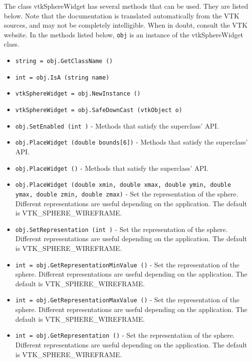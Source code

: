 The class vtkSphereWidget has several methods that can be used.
  They are listed below.
Note that the documentation is translated automatically from the VTK sources,
and may not be completely intelligible.  When in doubt, consult the VTK website.
In the methods listed below, \verb|obj| is an instance of the vtkSphereWidget class.
\begin{itemize}
\item  \verb|string = obj.GetClassName ()|

\item  \verb|int = obj.IsA (string name)|

\item  \verb|vtkSphereWidget = obj.NewInstance ()|

\item  \verb|vtkSphereWidget = obj.SafeDownCast (vtkObject o)|

\item  \verb|obj.SetEnabled (int )| -  Methods that satisfy the superclass' API.

\item  \verb|obj.PlaceWidget (double bounds[6])| -  Methods that satisfy the superclass' API.

\item  \verb|obj.PlaceWidget ()| -  Methods that satisfy the superclass' API.

\item  \verb|obj.PlaceWidget (double xmin, double xmax, double ymin, double ymax, double zmin, double zmax)| -  Set the representation of the sphere. Different representations are
 useful depending on the application. The default is 
 VTK\_SPHERE\_WIREFRAME.

\item  \verb|obj.SetRepresentation (int )| -  Set the representation of the sphere. Different representations are
 useful depending on the application. The default is 
 VTK\_SPHERE\_WIREFRAME.

\item  \verb|int = obj.GetRepresentationMinValue ()| -  Set the representation of the sphere. Different representations are
 useful depending on the application. The default is 
 VTK\_SPHERE\_WIREFRAME.

\item  \verb|int = obj.GetRepresentationMaxValue ()| -  Set the representation of the sphere. Different representations are
 useful depending on the application. The default is 
 VTK\_SPHERE\_WIREFRAME.

\item  \verb|int = obj.GetRepresentation ()| -  Set the representation of the sphere. Different representations are
 useful depending on the application. The default is 
 VTK\_SPHERE\_WIREFRAME.


\end{itemize}
